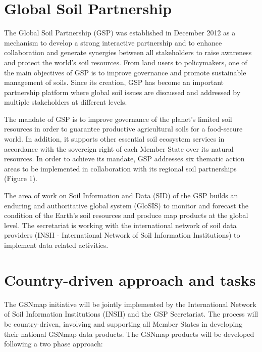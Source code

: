 \documentclass[
  10pt,
  b5paper,
  oneside]{book}
\begin{document}
\hypertarget{global-soil-partnership}{%
\section{Global Soil Partnership}\label{global-soil-partnership}}

The Global Soil Partnership (GSP) was established in December 2012 as a mechanism to develop a strong interactive partnership and to enhance collaboration and generate synergies between all stakeholders to raise awareness and protect the world's soil resources. From land users to policymakers, one of the main objectives of GSP is to improve governance and promote sustainable management of soils. Since its creation, GSP has become an important partnership platform where global soil issues are discussed and addressed by multiple stakeholders at different levels.

The mandate of GSP is to improve governance of the planet's limited soil resources in order to guarantee productive agricultural soils for a food-secure world. In addition, it supports other essential soil ecosystem services in accordance with the sovereign right of each Member State over its natural resources. In order to achieve its mandate, GSP addresses six thematic action areas to be implemented in collaboration with its regional soil partnerships (Figure 1).

The area of work on Soil Information and Data (SID) of the GSP builds an enduring and authoritative global system (GloSIS) to monitor and forecast the condition of the Earth's soil resources and produce map products at the global level. The secretariat is working with the international network of soil data providers (INSII - International Network of Soil Information Institutions) to implement data related activities.

\hypertarget{country-driven-approach-and-tasks}{%
\section{Country-driven approach and tasks}\label{country-driven-approach-and-tasks}}

The GSNmap initiative will be jointly implemented by the International Network of Soil Information Institutions (INSII) and the GSP Secretariat. The process will be country-driven, involving and supporting all Member States in developing their national GSNmap data products. The GSNmap products will be developed following a two phase approach:
\end{document}
